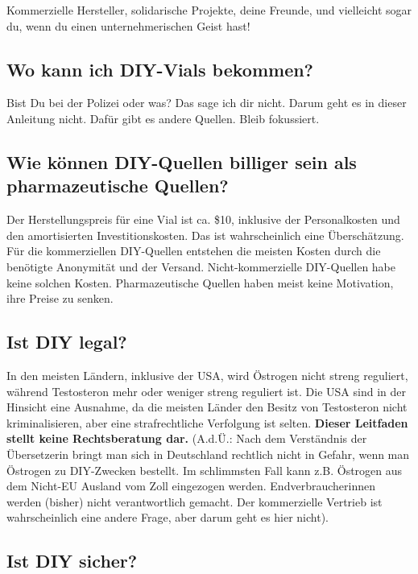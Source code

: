 \documentclass{article}
\begin{document}
{Kommerzielle Hersteller, solidarische Projekte, deine Freunde, und vielleicht sogar du, wenn du einen unternehmerischen Geist hast!

\subsection{Wo kann ich DIY-Vials bekommen?}

Bist Du bei der Polizei oder was? Das sage ich dir nicht. Darum geht es in dieser Anleitung nicht. Dafür gibt es andere Quellen. Bleib fokussiert.

\subsection{Wie können DIY-Quellen billiger sein als pharmazeutische Quellen?}

Der Herstellungspreis für eine Vial ist ca. \$10, inklusive der Personalkosten und den amortisierten Investitionskosten. Das ist wahrscheinlich eine Überschätzung. Für die kommerziellen DIY-Quellen entstehen die meisten Kosten durch die benötigte Anonymität und der Versand. Nicht-kommerzielle DIY-Quellen habe keine solchen Kosten. Pharmazeutische Quellen haben meist keine Motivation, ihre Preise zu senken. 

\subsection{Ist DIY legal?}\label{6-11}

In den meisten Ländern, inklusive der USA, wird Östrogen nicht streng reguliert, während Testosteron mehr oder weniger streng reguliert ist. Die USA sind in der Hinsicht eine Ausnahme, da die meisten Länder den Besitz von Testosteron nicht kriminalisieren, aber eine strafrechtliche Verfolgung ist selten. \textbf{Dieser Leitfaden stellt keine Rechtsberatung dar.} 
(A.d.Ü.: Nach dem Verständnis der Übersetzerin bringt man sich in Deutschland rechtlich nicht in Gefahr, wenn man Östrogen zu DIY-Zwecken bestellt. Im schlimmsten Fall kann z.B. Östrogen aus dem Nicht-EU Ausland vom Zoll eingezogen werden. Endverbraucherinnen werden (bisher) nicht verantwortlich gemacht. Der kommerzielle Vertrieb ist wahrscheinlich eine andere Frage, aber darum geht es hier nicht).

\subsection{Ist DIY sicher?}

}
\end{document}
